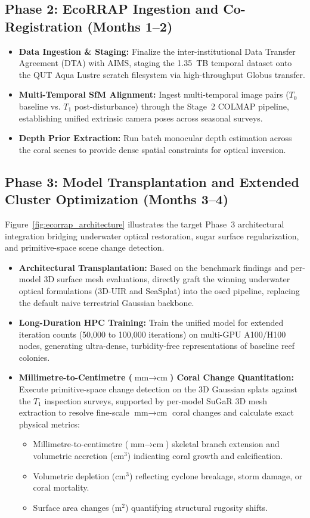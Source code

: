 \subsection{Phase 2: EcoRRAP Ingestion and Co-Registration (Months 1–2)}
\begin{itemize}
    \item \textbf{Data Ingestion \& Staging:} Finalize the inter-institutional Data Transfer Agreement (DTA) with AIMS, staging the 1.35~TB temporal dataset onto the QUT Aqua Lustre scratch filesystem via high-throughput Globus transfer.
    \item \textbf{Multi-Temporal SfM Alignment:} Ingest multi-temporal image pairs ($T_0$ baseline vs. $T_1$ post-disturbance) through the Stage~2 COLMAP pipeline, establishing unified extrinsic camera poses across seasonal surveys.
    \item \textbf{Depth Prior Extraction:} Run batch monocular depth estimation across the coral scenes to provide dense spatial constraints for optical inversion.
\end{itemize}

\subsection{Phase 3: Model Transplantation and Extended Cluster Optimization (Months 3–4)}
Figure~\ref{fig:ecorrap_architecture} illustrates the target Phase~3 architectural integration bridging underwater optical restoration, \gls{sugar} surface regularization, and primitive-space scene change detection.
\begin{itemize}
    \item \textbf{Architectural Transplantation:} Based on the benchmark findings and per-model 3D surface mesh evaluations, directly graft the winning underwater optical formulations (3D-UIR and SeaSplat) into the \gls{oscd} pipeline, replacing the default naive terrestrial Gaussian backbone.
    \item \textbf{Long-Duration HPC Training:} Train the unified model for extended iteration counts (50,000 to 100,000 iterations) on multi-GPU A100/H100 nodes, generating ultra-dense, turbidity-free representations of baseline reef colonies.
    \item \textbf{Millimetre-to-Centimetre ($\text{mm} \to \text{cm}$) Coral Change Quantitation:} Execute primitive-space change detection on the 3D Gaussian splats against the $T_1$ inspection surveys, supported by per-model SuGaR 3D mesh extraction to resolve fine-scale $\text{mm} \to \text{cm}$ coral changes and calculate exact physical metrics:
    \begin{itemize}
        \item Millimetre-to-centimetre ($\text{mm} \to \text{cm}$) skeletal branch extension and volumetric accretion ($\text{cm}^3$) indicating coral growth and calcification.
        \item Volumetric depletion ($\text{cm}^3$) reflecting cyclone breakage, storm damage, or coral mortality.
        \item Surface area changes ($\text{m}^2$) quantifying structural rugosity shifts.
    \end{itemize}
\end{itemize}


